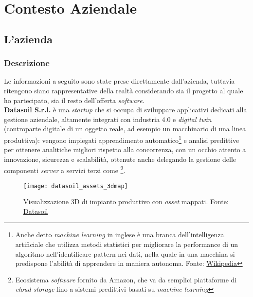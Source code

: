 
\chapter{Contesto Aziendale}
\label{cap:contesto-aziendale}

\section{L'azienda}
\subsection{Descrizione}
Le informazioni a seguito sono state prese direttamente dall'azienda, tuttavia ritengono siano rappresentative della realtà considerando sia il progetto al quale ho partecipato, sia il resto dell'offerta \textit{software}.\\
\textbf{Datasoil S.r.l.} è una \textit{startup} che si occupa di sviluppare applicativi dedicati alla gestione aziendale, altamente integrati con industria 4.0 e \textit{digital twin} (controparte digitale di un oggetto reale, ad esempio un macchinario di una linea produttiva): vengono impiegati apprendimento automatico\footnote{Anche detto \textit{machine learning} in inglese è una branca dell'intelligenza artificiale che utilizza metodi statistici per migliorare la performance di un algoritmo nell'identificare pattern nei dati, nella quale in una macchina si predispone l'abilità di apprendere in maniera autonoma. {\tiny Fonte: \href{https://it.wikipedia.org/wiki/Apprendimento_automatico}{Wikipedia}}} e analisi predittive per ottenere analitiche migliori rispetto alla concorrenza, con un occhio attento a innovazione, sicurezza e scalabilità, ottenute anche delegando la gestione delle componenti \textit{server} a servizi terzi come \aws{}\footnote{Ecosistema \textit{software} fornito da Amazon, che va da semplici piattaforme di \textit{cloud storage} fino a sistemi predittivi basati su \textit{machine learning}}.\\
\begin{figure}[ht]
    \centering
    \texttt{[image: datasoil\_assets\_3dmap]}
    \caption{Visualizzazione 3D di impianto produttivo con \textit{asset} mappati. Fonte: \href{https://datasoil.it/industry-40-smartcity-syn-asset-performance/auditing-inventory/}{Datasoil}}
\end{figure}\aCapo{}
